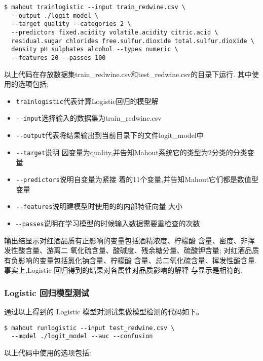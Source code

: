 \begin{lstlisting}
$ mahout trainlogistic --input train_redwine.csv \
  --output ./logit_model \
  --target quality --categories 2 \
  --predictors fixed.acidity volatile.acidity citric.acid \
  residual.sugar chlorides free.sulfur.dioxide total.sulfur.dioxide \
  density pH sulphates alcohol --types numeric \
  --features 20 --passes 100
\end{lstlisting}

以上代码在存放数据集train\_redwine.csv和test\_redwine.csv的目录下运行.
其中使用的选项包括:

\begin{itemize}
\item
  \lstinline!trainlogistic!代表计算Logistic回归的模型解
\item
  \lstinline!--input!选择输入的数据集为train\_redwine.csv
\item
  \lstinline!--output!代表将结果输出到当前目录下的文件logit\_model中
\item
  \lstinline!--target!说明
  因变量为quality,并告知Mahout系统它的类型为2分类的分类变量
\item
  \lstinline!--predictors!说明自变量为紧接
  着的11个变量,并告知Mahout它们都是数值型变量
\item
  \lstinline!--features!说明建模型时使用的的内部特征向量 大小
\item
  -\lstinline!-passes!说明在学习模型的时候输入数据需要重检查的次数
\end{itemize}

输出结显示对红酒品质有正影响的变量包括酒精浓度、柠檬酸
含量、密度、非挥发性酸含量、游离二
氧化硫含量、酸碱度、残余糖分量、硫酸钾含量;
对红酒品质有负影响的变量包括氯化钠含量、柠檬酸
含量、总二氧化硫含量、挥发性酸含量. 事实上,Logistic
回归得到的结果对各属性对品质影响的解释 与显示是相符的.

\subsubsection{Logistic
回归模型测试}\label{logistic-ux56deux5f52ux6a21ux578bux6d4bux8bd5}

通过以上得到的 Logistic 模型对测试集做模型检测的代码如下。

\begin{lstlisting}
$ mahout runlogistic --input test_redwine.csv \
  --model ./logit_model --auc --confusion
\end{lstlisting}

以上代码中使用的选项包括:

